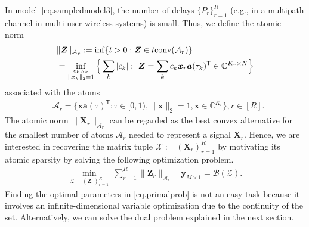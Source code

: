 \documentclass[conference,10pt]{IEEEtran}
\theoremstyle{remark}
\theoremstyle{plain}
\theoremstyle{definition}
\theoremstyle{remark}
\begin{document}
 In model~\eqref{eq.sampledmodel3}, the number of delays $\{P_r\}_{r=1}^R$ (e.g., in a multipath channel in multi-user wireless systems) is small. 
 Thus, we define the atomic norm~\cite{chandrasekaran2012convex}
 \begin{align}\label{eq.atomic_def}
 &\|\bm{Z}\|_{\mathcal{A}_r}:=\inf\{t>0: \bm{Z}\in t{\rm conv}(\mathcal{A}_r)\}\nonumber\\
 &=\inf_{\substack{c_k, \tau_k\\\|{\bm{x}_k}\|_2=1}}\Big\{\sum_{k}|c_k|:~\bm{Z}=\sum_{k}c_k \bm{x}_r\bm{a}(\tau_k)^{\mathsf{T}}  \in\mathbb{C}^{K_r\times N} \Big\}
 \end{align}
 associated with the atoms
 \begin{align}
 &\mathcal{A}_r=\big\{\bm{x}\bm{a}(\tau)^{\mathsf{T}}: \tau\in[0,1), \|\bm{x}\|_2=1, \bm{x}\in\mathbb{C}^{K_r} \big\}, r\in [R].
 \end{align}
  The atomic norm $\|\bm{X}_r\|_{\mathcal{A}_r}$ can be regarded as the best convex alternative for the smallest number of atoms $\mathcal{A}_r$ needed to represent a signal $\bm{X}_r$. Hence, we are interested in recovering the matrix tuple $\bm{\mathcal{X}}:=(\bm{X}_r)_{r=1}^R$ by motivating its atomic sparsity by solving the following optimization problem. 
 \begin{align}\label{eq.primalprob}
 \min_{\bm{\mathcal{Z}}=(\bm{Z}_r)_{r=1}^R} ~\sum_{r=1}^{R}\|\bm{Z}_r\|_{\mathcal{A}_r}\quad 
 \bm{y}_{M\times 1}=\mathcal{B}(\bm{\mathcal{Z}}).	
 \end{align} 
Finding the optimal parameters in \eqref{eq.primalprob} is not an easy task because it involves an infinite-dimensional variable optimization due to the continuity of the set. Alternatively, we can solve the dual problem explained in the next section.   


\end{document}

